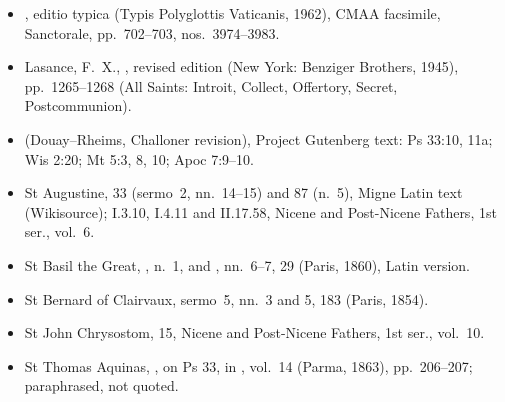 {\footnotesize
\begin{itemize}\setlength{\itemsep}{0.15em}\setlength{\parskip}{0pt}
\item {}, editio typica (Typis Polyglottis Vaticanis, 1962), CMAA facsimile, Sanctorale, pp.~702--703, nos.~3974--3983.
\item Lasance, F.~X., , revised edition (New York: Benziger Brothers, 1945), pp.~1265--1268 (All Saints: Introit, Collect, Offertory, Secret, Postcommunion).
\item {} (Douay--Rheims, Challoner revision), Project Gutenberg text: Ps 33:10, 11a; Wis 2:20; Mt 5:3, 8, 10; Apoc 7:9--10.
\item St Augustine,  33 (sermo~2, nn.~14--15) and 87 (n.~5), Migne Latin text (Wikisource);  I.3.10, I.4.11 and II.17.58, Nicene and Post-Nicene Fathers, 1st ser., vol.~6.
\item St Basil the Great, , n.~1, and , nn.~6--7,  29 (Paris, 1860), Latin version.
\item St Bernard of Clairvaux,  sermo~5, nn.~3 and 5,  183 (Paris, 1854).
\item St John Chrysostom,  15, Nicene and Post-Nicene Fathers, 1st ser., vol.~10.
\item St Thomas Aquinas, , on Ps 33, in , vol.~14 (Parma, 1863), pp.~206--207; paraphrased, not quoted.
\end{itemize}
\par}
